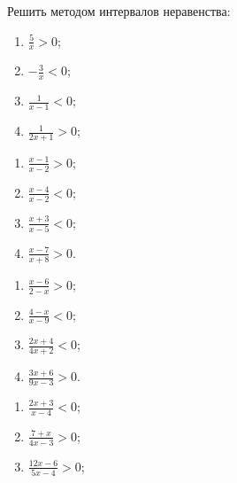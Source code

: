 \documentclass[algebra,twocolumn]{pum}
\begin{document}
\begin{exercises}
  Решить методом интервалов неравенства:
\begin{question}
  \vspace{-24pt}
  \begin{multicols}{2}
  \begin{enumerate}
    \item $\frac{5}{x}>0$;
    \item $-\frac{3}{x}<0$;
    \item $\frac{1}{x-1}<0$;
    \item $\frac{1}{2x+1}>0$;
    \end{enumerate}
  \end{multicols}
\end{question}
\begin{question}
  \vspace{-24pt}
  \begin{multicols}{2}
  \begin{enumerate}
    \item $\frac{x-1}{x-2}>0$;
    \item $\frac{x-4}{x-2}<0$;
    \item $\frac{x+3}{x-5}<0$;
    \item $\frac{x-7}{x+8}>0$.
  \end{enumerate}
\end{multicols}
\end{question}
\begin{question}
  \vspace{-24pt}
  \begin{multicols}{2}
  \begin{enumerate}
    \item $\frac{x-6}{2-x}>0$;
    \item $\frac{4-x}{x-9}<0$;
    \item $\frac{2x+4}{4x+2}<0$;
    \item $\frac{3x+6}{9x-3}>0$.
  \end{enumerate}
\end{multicols}
\end{question}
\begin{question}
  \vspace{-24pt}
  \begin{multicols}{2}
  \begin{enumerate}
    \item $\frac{2x+3}{x-4}<0$;
    \item $\frac{7+x}{4x-3}>0$;
    \item $\frac{12x-6}{5x-4}>0$;

\end{enumerate}
\end{multicols}
\end{question}
\end{exercises}
\end{document}

